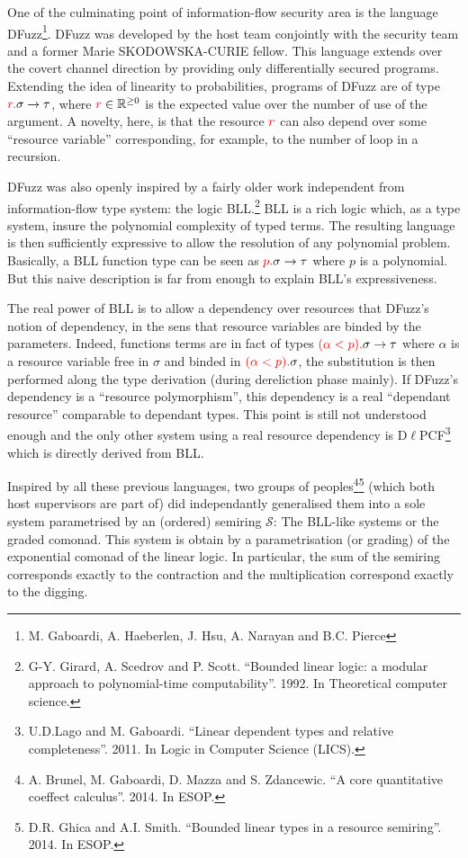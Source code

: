 \documentclass{article}[11pt]
\newcommand\sS{\mathcal S}
\begin{document}
One of the culminating point of information-flow security area is the language DFuzz\footnote{M. Gaboardi, A. Haeberlen, J. Hsu, A. Narayan and B.C. Pierce}. DFuzz was developed by the host team conjointly with the security team and a former Marie SKODOWSKA-CURIE fellow. This language extends over the covert channel direction by providing only differentially secured programs. Extending the idea of linearity to probabilities, programs of DFuzz are of type ${\color{red}r.}\sigma\rightarrow \tau$, where ${\color{red}r}\in \mathbb{R}^{\ge 0}$ is the expected value over the number of use of the argument. A novelty, here, is that the resource ${\color{red}r}$ can also depend over some ``resource variable'' corresponding, for example, to the number of loop in a recursion.

DFuzz was also openly inspired by a fairly older work independent from information-flow type system: the logic BLL.\footnote{G-Y. Girard, A. Scedrov and P. Scott. ``Bounded linear logic: a modular approach to polynomial-time computability''. 1992. In Theoretical computer science.} BLL is a rich logic which, as a type system, insure the polynomial complexity of typed terms. The resulting language is then sufficiently expressive to allow the resolution of any polynomial problem. Basically, a BLL function type can be seen as  ${\color{red}p.}\sigma\rightarrow \tau$ where $p$ is a polynomial. But this naive description is far from enough to explain BLL's expressiveness.

The real power of BLL is to allow a dependency over resources that DFuzz's notion of dependency, in the sens that resource variables are binded by the parameters. Indeed, functions terms are in fact of types ${\color{red}(\alpha<p).}\sigma\rightarrow \tau$ where $\alpha$ is a resource variable free in $\sigma$ and binded in ${\color{red}(\alpha<p).}\sigma$, the substitution is then performed along the type derivation (during dereliction phase mainly). If DFuzz's dependency is a ``resource polymorphism'', this dependency is a real ``dependant resource'' comparable to dependant types. This point is still not understood enough and the only other system using a real resource dependency is D$\ell$PCF\footnote{U.D.Lago and M. Gaboardi. ``Linear dependent types and relative completeness''. 2011. In Logic in Computer Science (LICS).} which is directly derived from BLL.

Inspired by all these previous languages, two groups of peoples\footnote{A. Brunel, M. Gaboardi, D. Mazza and S. Zdancewic. ``A core quantitative coeffect calculus''. 2014. In ESOP.}\footnote{D.R. Ghica and A.I. Smith. ``Bounded linear types in a resource semiring''. 2014. In ESOP.} (which both host supervisors are part of) did independantly generalised them into a sole system parametrised by an (ordered) semiring $\sS$: The BLL-like systems or the graded comonad.  This system is obtain by a parametrisation (or grading) of the exponential comonad of the linear logic. In particular, the sum of the semiring corresponds exactly to the contraction and the multiplication correspond exactly to the digging. 
\end{document}
